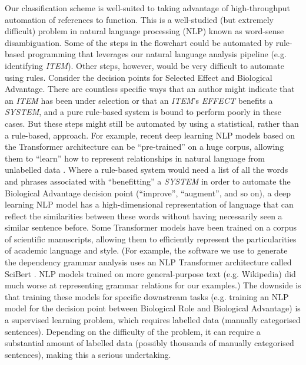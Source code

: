 \documentclass{article}
\begin{document}
Our classification scheme is well-suited to taking advantage of high-throughput automation of references to function.
This is a well-studied (but extremely difficult) problem in natural language processing (NLP) known as word-sense disambiguation.
Some of the steps in the flowchart could be automated by rule-based programming that leverages our natural language analysis pipeline (e.g. identifying \emph{ITEM}).
Other steps, however, would be very difficult to automate using rules.
Consider the decision points for Selected Effect and Biological Advantage.
There are countless specific ways that an author might indicate that an \emph{ITEM} has been under selection or that an \emph{ITEM}'s \emph{EFFECT} benefits a \emph{SYSTEM}, and a pure rule-based system is bound to perform poorly in these cases.
But these steps might still be automated by using a statistical, rather than a rule-based, approach.
For example, recent deep learning NLP models based on the Transformer architecture can be ``pre-trained'' on a huge corpus, allowing them to ``learn'' how to represent relationships in natural language from unlabelled data \cite{devlin2019}.
Where a rule-based system would need a list of all the words and phrases associated with ``benefitting'' a \emph{SYSTEM} in order to automate the Biological Advantage decision point (``improve'', ``augment'', and so on), a deep learning NLP model has a high-dimensional representation of language that can reflect the similarities between these words without having necessarily seen a similar sentence before.
Some Transformer models have been trained on a corpus of scientific manuscripts, allowing them to efficiently represent the particularities of academic language and style.
(For example, the software we use to generate the dependency grammar analysis uses an NLP Transformer architecture called SciBert \cite{scispacy}. NLP models trained on more general-purpose text (e.g. Wikipedia) did much worse at representing grammar relations for our examples.)
The downside is that training these models for specific downstream tasks (e.g. training an NLP model for the decision point between Biological Role and Biological Advantage) is a supervised learning problem, which requires labelled data (manually categorised sentences).
Depending on the difficulty of the problem, it can require a substantial amount of labelled data (possibly thousands of manually categorised sentences), making this a serious undertaking.
\end{document}
